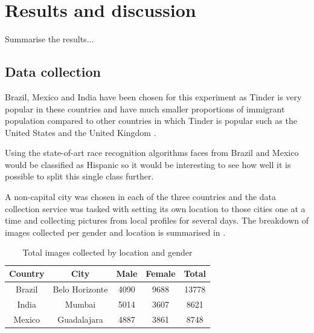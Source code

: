 \chapter{Results and discussion}
\label{results}
Summarise the results...

\section{Data collection}
\label{results:collection}
Brazil, Mexico and India have been chosen for this experiment as Tinder is very
popular in these countries \citep{tinderPopular} and have much smaller
proportions of immigrant population compared to other countries in which Tinder
is popular such as the United States and the United Kingdom
\citep{desa2013trends}.

Using the state-of-art race recognition algorithms faces from Brazil and Mexico
would be classified as Hispanic so it would be interesting to see how well it
is possible to split this single class further. 

A non-capital city was chosen in each of the three countries and the data
collection service was tasked with setting its own location to those cities one
at a time and collecting pictures from local profiles for several days. The
breakdown of images collected per gender and location is summarised in
.
\begin{table}[t]
    \begin{center}
        \begin{tabular}{ c c c c c }
            \toprule
            Country       & City              & Male   & Female & Total \\ 
            \toprule
            Brazil  & Belo Horizonte &  4090 & 9688 & 13778\\
            India   & Mumbai         &  5014 & 3607 & 8621 \\
            Mexico  & Guadalajara    &  4887 & 3861 & 8748\\
            \bottomrule
        \end{tabular}
    \end{center}
    \caption{Total images collected by location and gender}
    \label{table:results:dc:total_images}
\end{table}

